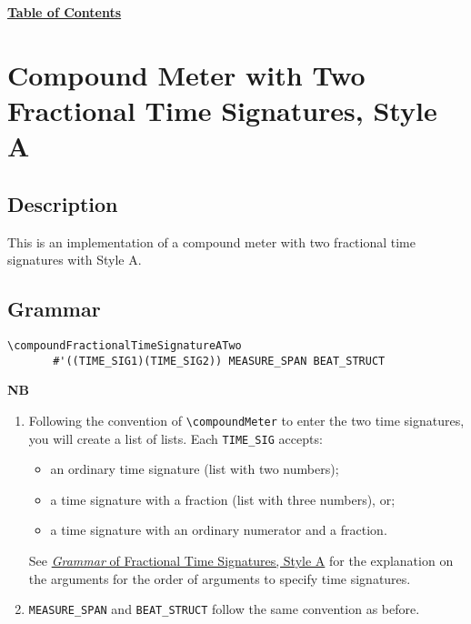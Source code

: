 \hyperref[sec:toc]{\textbf{Table of Contents}}

\vfill \break




\section {Compound Meter with Two Fractional Time Signatures, Style A}

\hfill
{}
\hfill

\subsection{Description}
This is an implementation of a compound meter with two fractional time signatures with Style A.  

\subsection{Grammar}
\begin{verbatim}
\compoundFractionalTimeSignatureATwo
       #'((TIME_SIG1)(TIME_SIG2)) MEASURE_SPAN BEAT_STRUCT
\end{verbatim}
\textbf{NB} 
\begin{enumerate}
\item Following the convention of \verb|\compoundMeter| to enter the two time signatures, you will create a list of lists. Each \verb|TIME_SIG| accepts:\par
\begin{itemize} 
\item an ordinary time signature (list with two numbers); 
\item a time signature with a fraction (list with three numbers), or;
\item a time signature with an ordinary numerator and a fraction.
\end{itemize} 
See \hyperref[sec:time_signatures_styleA_convention]{\textit{Grammar} of Fractional Time Signatures, Style A} for the explanation on the arguments for the order of arguments to specify time signatures.
\item \verb|MEASURE_SPAN| and \verb|BEAT_STRUCT| follow the same convention as before.
\end{enumerate}
